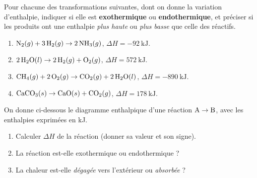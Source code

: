 \documentclass[11pt,a4paper]{article}
\newcommand{\dH}{\Delta H}
\begin{document}
\begin{exercice}[exo ou endo à partir du signe de $\dH$]
Pour chacune des transformations suivantes, dont on donne la variation d'enthalpie, indiquer si elle est
\textbf{exothermique} ou \textbf{endothermique}, et préciser si les produits ont une enthalpie
\emph{plus haute} ou \emph{plus basse} que celle des réactifs.
\begin{enumerate}[label=\alph*),leftmargin=2em,topsep=2pt,itemsep=2pt]
  \item $\ce{N2}(g) + 3\,\ce{H2}(g) \rightarrow 2\,\ce{NH3}(g)$, \quad $\dH = \SI{-92}{\kilo\joule}$.
  \item $2\,\ce{H2O}(l) \rightarrow 2\,\ce{H2}(g) + \ce{O2}(g)$, \quad $\dH = \SI{+572}{\kilo\joule}$.
  \item $\ce{CH4}(g) + 2\,\ce{O2}(g) \rightarrow \ce{CO2}(g) + 2\,\ce{H2O}(l)$, \quad $\dH = \SI{-890}{\kilo\joule}$.
  \item $\ce{CaCO3}(s) \rightarrow \ce{CaO}(s) + \ce{CO2}(g)$, \quad $\dH = \SI{+178}{\kilo\joule}$.
\end{enumerate}
\end{exercice}

\begin{exercice}
On donne ci-dessous le diagramme enthalpique d'une réaction $\ce{A} \rightarrow \ce{B}$, avec les
enthalpies exprimées en \si{\kilo\joule}.
\begin{center}
\end{center}
\begin{enumerate}[label=\alph*),leftmargin=2em,topsep=2pt,itemsep=2pt]
  \item Calculer $\dH$ de la réaction (donner sa valeur et son signe).
  \item La réaction est-elle exothermique ou endothermique ?
  \item La chaleur est-elle \emph{dégagée} vers l'extérieur ou \emph{absorbée} ?
\end{enumerate}
\end{exercice}
\end{document}

